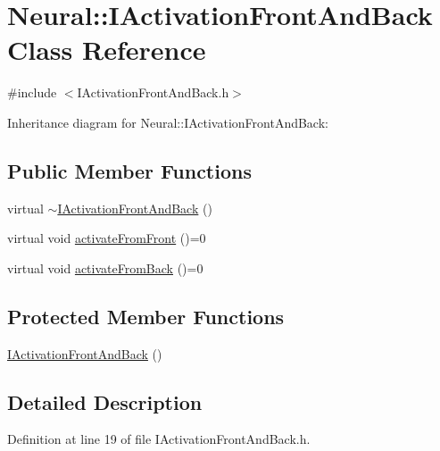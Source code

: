 \hypertarget{class_neural_1_1_i_activation_front_and_back}{
\section{Neural::IActivationFrontAndBack Class Reference}
\label{class_neural_1_1_i_activation_front_and_back}
}


{\ttfamily \#include $<$IActivationFrontAndBack.h$>$}



Inheritance diagram for Neural::IActivationFrontAndBack:
\subsection*{Public Member Functions}
\begin{DoxyCompactItemize}
\item 
virtual \hyperlink{class_neural_1_1_i_activation_front_and_back_a77f6a756e03fee17f373b1c022ab89fa}{$\sim$IActivationFrontAndBack} ()
\item 
virtual void \hyperlink{class_neural_1_1_i_activation_front_and_back_a214808de3ba71d87924e7baaaac55c93}{activateFromFront} ()=0
\item 
virtual void \hyperlink{class_neural_1_1_i_activation_front_and_back_a204810c0e42e7b33e0e3d464ea925b6b}{activateFromBack} ()=0
\end{DoxyCompactItemize}
\subsection*{Protected Member Functions}
\begin{DoxyCompactItemize}
\item 
\hyperlink{class_neural_1_1_i_activation_front_and_back_a8a6c2c909933d03e34e60d84217c904e}{IActivationFrontAndBack} ()
\end{DoxyCompactItemize}


\subsection{Detailed Description}


Definition at line 19 of file IActivationFrontAndBack.h.



